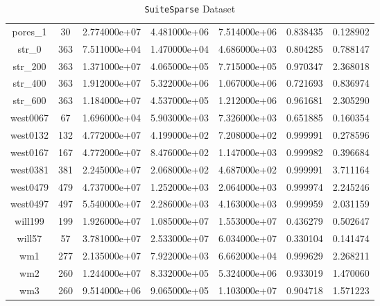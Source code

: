 \begin{table}[h]
\begin{tabular}{c|c|c|c|cc|c}
    pores\_1 & 30 & 2.774000e+07 & 4.481000e+06 & 7.514000e+06 & 0.838435 &
    0.128902\\
    str\_0 & 363 & 7.511000e+04 & 1.470000e+04 & 4.686000e+03 & 0.804285 &
    0.788147\\
    str\_200 & 363 & 1.371000e+07 & 4.065000e+05 & 7.715000e+05 & 0.970347 &
    2.368018\\
    str\_400 & 363 & 1.912000e+07 & 5.322000e+06 & 1.067000e+06 & 0.721693 &
    0.836974\\
    str\_600 & 363 & 1.184000e+07 & 4.537000e+05 & 1.212000e+06 & 0.961681 &
    2.305290\\
    west0067 & 67 & 1.696000e+04 & 5.903000e+03 & 7.326000e+03 & 0.651885 &
    0.160354\\
    west0132 & 132 & 4.772000e+07 & 4.199000e+02 & 7.208000e+02 & 0.999991 &
    0.278596\\
    west0167 & 167 & 4.772000e+07 & 8.476000e+02 & 1.147000e+03 & 0.999982 &
    0.396684\\
    west0381 & 381 & 2.245000e+07 & 2.068000e+02 & 4.687000e+02 & 0.999991 &
    3.711164\\
    west0479 & 479 & 4.737000e+07 & 1.252000e+03 & 2.064000e+03 & 0.999974 &
    2.245246\\
    west0497 & 497 & 5.540000e+07 & 2.286000e+03 & 4.163000e+03 & 0.999959 &
    2.031159\\
    will199 & 199 & 1.926000e+07 & 1.085000e+07 & 1.553000e+07 & 0.436279 &
    0.502647\\
    will57 & 57 & 3.781000e+07 & 2.533000e+07 & 6.034000e+07 & 0.330104 &
    0.141474\\
    wm1 & 277 & 2.135000e+07 & 7.922000e+03 & 6.662000e+04 & 0.999629 &
    2.268211\\
    wm2 & 260 & 1.244000e+07 & 8.332000e+05 & 5.324000e+06 & 0.933019 &
    1.470060\\
    wm3 & 260 & 9.514000e+06 & 9.065000e+05 & 1.103000e+07 & 0.904718 &
    1.571223\\
    \hline
  \end{tabular}
  \caption{\texttt{SuiteSparse} Dataset}
\end{table}

